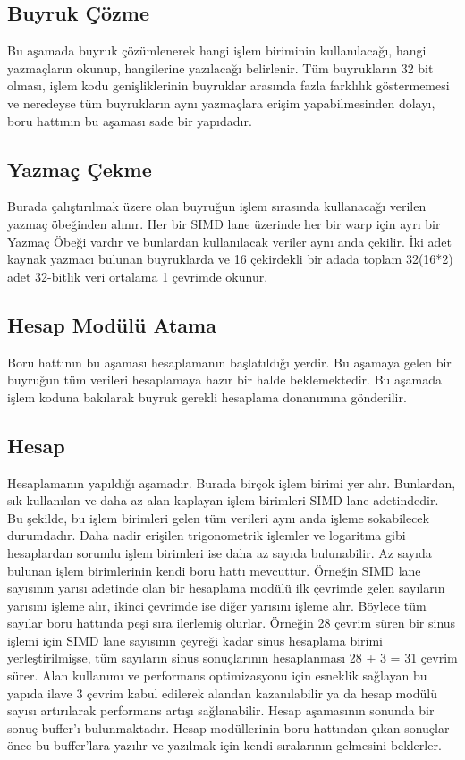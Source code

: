 \subsection{Buyruk Çözme}
Bu aşamada buyruk çözümlenerek hangi işlem biriminin kullanılacağı, hangi yazmaçların okunup, hangilerine yazılacağı belirlenir. Tüm buyrukların 32 bit olması, işlem kodu genişliklerinin buyruklar arasında fazla farklılık göstermemesi ve neredeyse tüm buyrukların aynı yazmaçlara erişim yapabilmesinden dolayı, boru hattının bu aşaması sade bir yapıdadır.
\subsection{Yazmaç Çekme}
Burada çalıştırılmak üzere olan buyruğun işlem sırasında kullanacağı verilen yazmaç öbeğinden alınır. Her bir SIMD lane üzerinde her bir warp için ayrı bir Yazmaç Öbeği vardır ve bunlardan kullanılacak veriler aynı anda çekilir. İki adet kaynak yazmacı bulunan buyruklarda ve 16 çekirdekli bir adada toplam 32(16*2) adet 32-bitlik veri ortalama 1 çevrimde okunur.
\subsection{Hesap Modülü Atama}
Boru hattının bu aşaması hesaplamanın başlatıldığı yerdir. Bu aşamaya gelen bir buyruğun tüm verileri hesaplamaya hazır bir halde beklemektedir. Bu aşamada işlem koduna bakılarak buyruk gerekli hesaplama donanımına gönderilir.
\subsection{Hesap}
Hesaplamanın yapıldığı aşamadır. Burada birçok işlem birimi yer alır. Bunlardan, sık kullanılan ve daha az alan kaplayan işlem birimleri SIMD lane adetindedir. Bu şekilde, bu işlem birimleri gelen tüm verileri aynı anda işleme sokabilecek durumdadır. Daha nadir erişilen trigonometrik işlemler ve logaritma gibi hesaplardan sorumlu işlem birimleri ise daha az sayıda bulunabilir. Az sayıda bulunan işlem birimlerinin kendi boru hattı mevcuttur. Örneğin SIMD lane sayısının yarısı adetinde olan bir hesaplama modülü ilk çevrimde gelen sayıların yarısını işleme alır, ikinci çevrimde ise diğer yarısını işleme alır. Böylece tüm sayılar boru hattında peşi sıra ilerlemiş olurlar. Örneğin 28 çevrim süren bir sinus işlemi için SIMD lane sayısının çeyreği kadar sinus hesaplama birimi yerleştirilmişse, tüm sayıların sinus sonuçlarının hesaplanması 28 + 3 = 31 çevrim sürer. Alan kullanımı ve performans optimizasyonu için esneklik sağlayan bu yapıda ilave 3 çevrim kabul edilerek alandan kazanılabilir ya da hesap modülü sayısı artırılarak performans artışı sağlanabilir. Hesap aşamasının sonunda bir sonuç buffer'ı bulunmaktadır. Hesap modüllerinin boru hattından çıkan sonuçlar önce bu buffer'lara yazılır ve yazılmak için kendi sıralarının gelmesini beklerler. 

